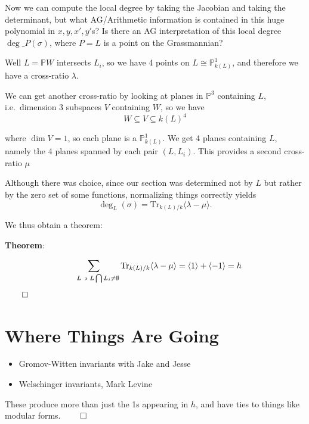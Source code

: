 \documentclass[11pt]{scrreprt}
\theoremstyle{definition}
\providecommand{\tightlist}{%
  \setlength{\itemsep}{0pt}\setlength{\parskip}{0pt}}
\newcommand{\PP}[0]{{\mathbb{P}}}
\newcommand{\Tr}[0]{\mathrm{Tr}}
\newcommand{\suchthat}[0]{{~\backepsilon ~}}
\newcommand{\generators}[1]{\langle{#1}\rangle}
\newcommand{\intersect}[0]{\bigcap}
\begin{document}
Now we can compute the local degree by taking the Jacobian and taking
the determinant, but what AG/Arithmetic information is contained in this
huge polynomial in \(x,y,x',y'\)s? Is there an AG interpretation of this
local degree \(\deg\_P(\sigma)\), where \(P=L\) is a point on the
Grassmannian?

Well \(L=\PP W\) intersects \(L_i\), so we have 4 points on
\(L\cong \PP^1_{k(L)}\), and therefore we have a cross-ratio
\(\lambda\).

We can get another cross-ratio by looking at planes in \(\PP^3\)
containing \(L\), i.e.~dimension 3 subspaces \(V\) containing \(W\), so
we have \[
W \subseteq V \subseteq k(L)^4
\]

where \(\dim V = 1\), so each plane is a \(\PP^1_{k(L)}\). We get 4
planes containing \(L\), namely the 4 planes spanned by each pair
\((L, L_i)\). This provides a second cross-ratio \(\mu\)

Although there was choice, since our section was determined not by \(L\)
but rather by the zero set of some functions, normalizing things
correctly yields \[
\deg_L(\sigma) = \Tr_{k(L) / k}\generators{\lambda-\mu}.
\]

We thus obtain a theorem:

\textbf{Theorem}:

\[
\sum_{\quad L \suchthat \\ L \intersect L_i \neq\emptyset}\Tr_{k(L) / k}\generators{\lambda-\mu} = \generators{1} + \generators{-1} = h
\] \(\qed\)

\hypertarget{where-things-are-going}{%
\section{Where Things Are Going}\label{where-things-are-going}}

\begin{itemize}
\tightlist
\item
  Gromov-Witten invariants with Jake and Jesse
\item
  Welschinger invariants, Mark Levine
\end{itemize}

These produce more than just the 1s appearing in \(h\), and have ties to
things like modular forms. \(\qed\)

\listoftodos


\end{document}
